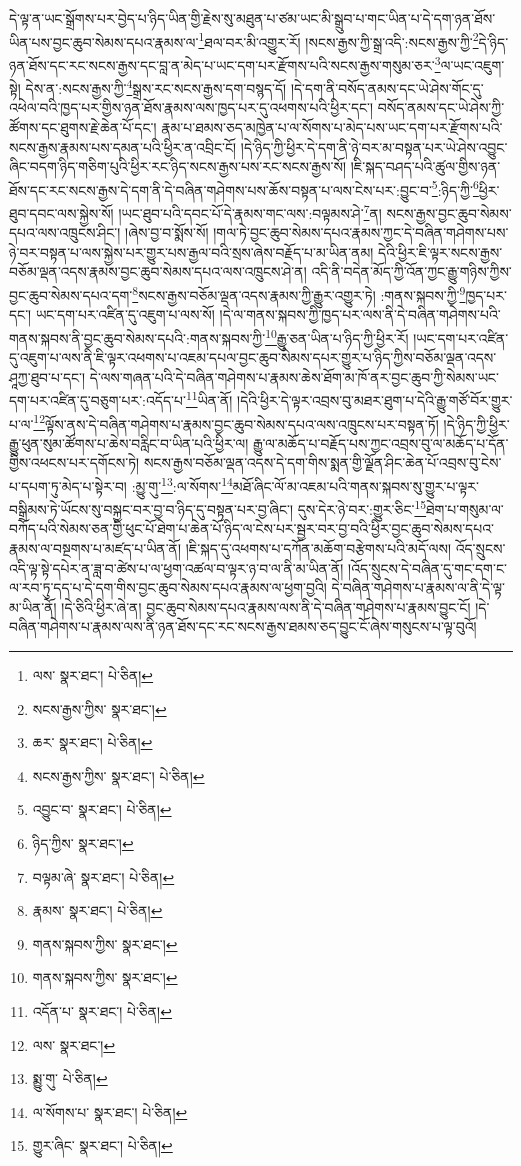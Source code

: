 དེ་ལྟ་ན་ཡང་སྒྲོགས་པར་བྱེད་པ་ཉིད་ཡིན་གྱི་རྗེས་སུ་མཐུན་པ་ཙམ་ཡང་མི་སྒྲུབ་པ་གང་ཡིན་པ་དེ་དག་ཉན་ཐོས་ཡིན་པས་བྱང་ཆུབ་སེམས་དཔའ་རྣམས་ལ་\footnote{ལས་  སྣར་ཐང་།  པེ་ཅིན། }ཐལ་བར་མི་འགྱུར་རོ། །སངས་རྒྱས་ཀྱི་སྒྲ་འདི་:སངས་རྒྱས་ཀྱི་\footnote{སངས་རྒྱས་ཀྱིས་  སྣར་ཐང་། }དེ་ཉིད་ཉན་ཐོས་དང་རང་སངས་རྒྱས་དང་བླ་ན་མེད་པ་ཡང་དག་པར་རྫོགས་པའི་སངས་རྒྱས་གསུམ་ཅར་\footnote{ཆར་  སྣར་ཐང་།  པེ་ཅིན། }ལ་ཡང་འཇུག་སྟེ། དེས་ན་:སངས་རྒྱས་ཀྱི་\footnote{སངས་རྒྱས་ཀྱིས་  སྣར་ཐང་།  པེ་ཅིན། }སྒྲས་རང་སངས་རྒྱས་དག་བསྙད་དོ། །དེ་དག་ནི་བསོད་ནམས་དང་ཡེ་ཤེས་གོང་དུ་འཕེལ་བའི་ཁྱད་པར་གྱིས་ཉན་ཐོས་རྣམས་ལས་ཁྱད་པར་དུ་འཕགས་པའི་ཕྱིར་དང་། བསོད་ནམས་དང་ཡེ་ཤེས་ཀྱི་ཚོགས་དང་ཐུགས་རྗེ་ཆེན་པོ་དང་། རྣམ་པ་ཐམས་ཅད་མཁྱེན་པ་ལ་སོགས་པ་མེད་པས་ཡང་དག་པར་རྫོགས་པའི་སངས་རྒྱས་རྣམས་པས་དམན་པའི་ཕྱིར་ན་འབྲིང་ངོ། །དེ་ཉིད་ཀྱི་ཕྱིར་དེ་དག་ནི་ཉེ་བར་མ་བསྟན་པར་ཡེ་ཤེས་འབྱུང་ཞིང་བདག་ཉིད་གཅིག་པུའི་ཕྱིར་རང་ཉིད་སངས་རྒྱས་པས་རང་སངས་རྒྱས་སོ། །ཇི་སྐད་བཤད་པའི་ཚུལ་གྱིས་ཉན་ཐོས་དང་རང་སངས་རྒྱས་དེ་དག་ནི་དེ་བཞིན་གཤེགས་པས་ཆོས་བསྟན་པ་ལས་ངེས་པར་:བྱུང་བ་\footnote{འབྱུང་བ་  སྣར་ཐང་།  པེ་ཅིན། }:ཉིད་ཀྱི་\footnote{ཉིད་ཀྱིས་  སྣར་ཐང་། }ཕྱིར་ཐུབ་དབང་ལས་སྐྱེས་སོ། །ཡང་ཐུབ་པའི་དབང་པོ་དེ་རྣམས་གང་ལས་:བལྟམས་ཤེ་\footnote{བལྟམ་ཞེ་  སྣར་ཐང་།  པེ་ཅིན། }ན། སངས་རྒྱས་བྱང་ཆུབ་སེམས་དཔའ་ལས་འཁྲུངས་ཤིང་། །ཞེས་བྱ་བ་སྨོས་སོ། །གལ་ཏེ་བྱང་ཆུབ་སེམས་དཔའ་རྣམས་ཀྱང་དེ་བཞིན་གཤེགས་པས་ཉེ་བར་བསྟན་པ་ལས་སྐྱེས་པར་གྱུར་པས་རྒྱལ་བའི་སྲས་ཞེས་བརྗོད་པ་མ་ཡིན་ནམ། དེའི་ཕྱིར་ཇི་ལྟར་སངས་རྒྱས་བཅོམ་ལྡན་འདས་རྣམས་བྱང་ཆུབ་སེམས་དཔའ་ལས་འཁྲུངས་ཤེ་ན། འདི་ནི་བདེན་མོད་ཀྱི་འོན་ཀྱང་རྒྱུ་གཉིས་ཀྱིས་བྱང་ཆུབ་སེམས་དཔའ་དག་\footnote{རྣམས་  སྣར་ཐང་།  པེ་ཅིན། }སངས་རྒྱས་བཅོམ་ལྡན་འདས་རྣམས་ཀྱི་རྒྱུར་འགྱུར་ཏེ། :གནས་སྐབས་ཀྱི་\footnote{གནས་སྐབས་ཀྱིས་  སྣར་ཐང་། }ཁྱད་པར་དང་། ཡང་དག་པར་འཛིན་དུ་འཇུག་པ་ལས་སོ། །དེ་ལ་གནས་སྐབས་ཀྱི་ཁྱད་པར་ལས་ནི་དེ་བཞིན་གཤེགས་པའི་གནས་སྐབས་ནི་བྱང་ཆུབ་སེམས་དཔའི་:གནས་སྐབས་ཀྱི་\footnote{གནས་སྐབས་ཀྱིས་  སྣར་ཐང་། }རྒྱུ་ཅན་ཡིན་པ་ཉིད་ཀྱི་ཕྱིར་རོ། །ཡང་དག་པར་འཛིན་དུ་འཇུག་པ་ལས་ནི་ཇི་ལྟར་འཕགས་པ་འཇམ་དཔལ་བྱང་ཆུབ་སེམས་དཔར་གྱུར་པ་ཉིད་ཀྱིས་བཅོམ་ལྡན་འདས་ཤཱཀྱ་ཐུབ་པ་དང་། དེ་ལས་གཞན་པའི་དེ་བཞིན་གཤེགས་པ་རྣམས་ཆེས་ཐོག་མ་ཁོ་ནར་བྱང་ཆུབ་ཀྱི་སེམས་ཡང་དག་པར་འཛིན་དུ་བཅུག་པར་:འདོད་པ་\footnote{འདོན་པ་  སྣར་ཐང་།  པེ་ཅིན། }ཡིན་ནོ། །དེའི་ཕྱིར་དེ་ལྟར་འབྲས་བུ་མཐར་ཐུག་པ་དེའི་རྒྱུ་གཙོ་བོར་གྱུར་པ་ལ་\footnote{ལས་  སྣར་ཐང་། }ལྟོས་ནས་དེ་བཞིན་གཤེགས་པ་རྣམས་བྱང་ཆུབ་སེམས་དཔའ་ལས་འཁྲུངས་པར་བསྟན་ཏོ། །དེ་ཉིད་ཀྱི་ཕྱིར་རྒྱུ་ཕུན་སུམ་ཚོགས་པ་ཆེས་བརླིང་བ་ཡིན་པའི་ཕྱིར་ལ། རྒྱུ་ལ་མཆོད་པ་བརྗོད་པས་ཀྱང་འབྲས་བུ་ལ་མཆོད་པ་དོན་གྱིས་འཕངས་པར་དགོངས་ཏེ། སངས་རྒྱས་བཅོམ་ལྡན་འདས་དེ་དག་གིས་སྨན་གྱི་ལྗོན་ཤིང་ཆེན་པོ་འབྲས་བུ་ངེས་པ་དཔག་ཏུ་མེད་པ་སྟེར་བ། :མྱུ་གུ་\footnote{སྨྱུ་གུ་  པེ་ཅིན། }:ལ་སོགས་\footnote{ལ་སོགས་པ་  སྣར་ཐང་།  པེ་ཅིན། }མཐོ་ཞིང་ལོ་མ་འཇམ་པའི་གནས་སྐབས་སུ་གྱུར་པ་ལྟར་བསྒྲིམས་ཏེ་ཡོངས་སུ་བསྐྱང་བར་བྱ་བ་ཉིད་དུ་བསྟན་པར་བྱ་ཞིང་། དུས་དེར་ཉེ་བར་:གྱུར་ཅིང་\footnote{གྱུར་ཞིང་  སྣར་ཐང་།  པེ་ཅིན། }ཐེག་པ་གསུམ་ལ་བཀོད་པའི་སེམས་ཅན་གྱི་ཕུང་པོ་ཐེག་པ་ཆེན་པོ་ཉིད་ལ་ངེས་པར་སྦྱར་བར་བྱ་བའི་ཕྱིར་བྱང་ཆུབ་སེམས་དཔའ་རྣམས་ལ་བསྔགས་པ་མཛད་པ་ཡིན་ནོ། །ཇི་སྐད་དུ་འཕགས་པ་དཀོན་མཆོག་བརྩེགས་པའི་མདོ་ལས། འོད་སྲུངས་འདི་ལྟ་སྟེ་དཔེར་ན་ཟླ་བ་ཚེས་པ་ལ་ཕྱག་འཚལ་བ་ལྟར་ཉ་བ་ལ་ནི་མ་ཡིན་ནོ། །འོད་སྲུངས་དེ་བཞིན་དུ་གང་དག་ང་ལ་རབ་ཏུ་དད་པ་དེ་དག་གིས་བྱང་ཆུབ་སེམས་དཔའ་རྣམས་ལ་ཕྱག་བྱའི། དེ་བཞིན་གཤེགས་པ་རྣམས་ལ་ནི་དེ་ལྟ་མ་ཡིན་ནོ། །དེ་ཅིའི་ཕྱིར་ཞེ་ན། བྱང་ཆུབ་སེམས་དཔའ་རྣམས་ལས་ནི་དེ་བཞིན་གཤེགས་པ་རྣམས་བྱུང་ངོ། །དེ་བཞིན་གཤེགས་པ་རྣམས་ལས་ནི་ཉན་ཐོས་དང་རང་སངས་རྒྱས་ཐམས་ཅད་བྱུང་ངོ་ཞེས་གསུངས་པ་ལྟ་བུའོ། 